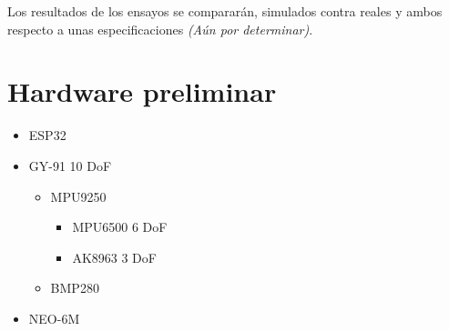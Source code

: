 \documentclass{sty/propuesta}
\begin{document}
Los resultados de los ensayos se compararán, simulados contra reales y ambos respecto a unas especificaciones \emph{(Aún por determinar)}.



\section{Hardware preliminar}
\begin{itemize}
    \item ESP32 \cite{espressif_idf_programming_guide}
    \item GY-91 10 DoF
        \begin{itemize}
            \item MPU9250\cite{invensense2016mpu9250}
                \begin{itemize}
                    \item MPU6500 6 DoF
                    \item AK8963 3 DoF
                \end{itemize}
        \end{itemize}
        
        \begin{itemize}
            \item BMP280 \cite{bme_2024}
        \end{itemize}
    \item NEO-6M
\end{itemize}



\printbibliography
\end{document}
